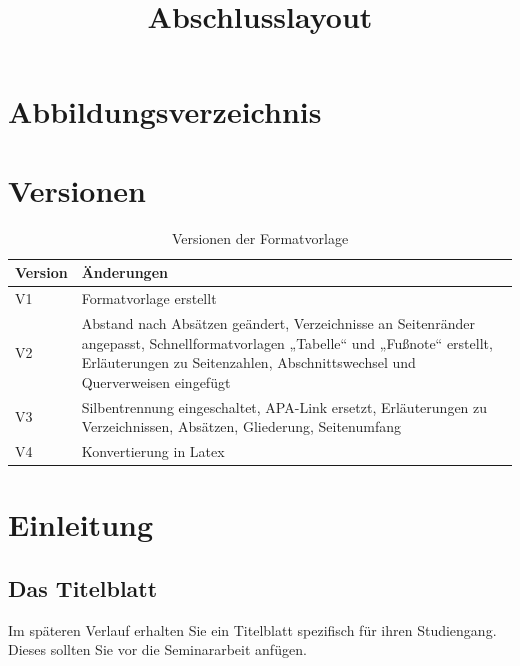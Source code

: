 \documentclass[a4paper,11pt]{article}
\title{Abschlusslayout}
\begin{document}
\justifying
{}



\renewcommand{\contentsname}{Inhaltsverzeichnis}

\tableofcontents\newpage

\newpage
\renewcommand{\listfigurename}{}
\section*{Abbildungsverzeichnis}
\listoffigures



\newpage
{}
\listoftables

\newpage
\section*{Versionen} %
\begin{table}[H]
\centering
\begin{tabular}{|p{2.0cm} |p{10.0cm}|}
    \hline
    Version     & Änderungen   \\ \hline
    V1          & Formatvorlage erstellt            \\ \hline
    V2          &  Abstand nach Absätzen geändert, Verzeichnisse an Seitenränder angepasst, Schnellformatvorlagen „Tabelle“ und „Fußnote“ erstellt, Erläuterungen zu Seitenzahlen, Abschnittswechsel und Querverweisen eingefügt               \\ \hline
    V3          & Silbentrennung eingeschaltet, APA-Link ersetzt, Erläuterungen zu Verzeichnissen, Absätzen, Gliederung, Seitenumfang          \\ \hline
    V4          & Konvertierung in Latex \\ \hline
\end{tabular}
\caption[Versionen der Formatvorlage]{Versionen der Formatvorlage}
\end{table}

\newpage
{}

\section{Einleitung}
\subsection{Das Titelblatt}
Im späteren Verlauf erhalten Sie ein Titelblatt spezifisch für ihren Studiengang. Dieses sollten Sie vor die Seminararbeit anfügen.
\end{document}
